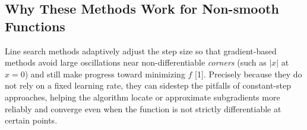\documentclass{article}
\begin{document}
\subsection{Why These Methods Work for Non-smooth Functions}
Line search methods adaptively adjust the step size so that gradient-based
methods avoid large oscillations near non-differentiable \emph{corners} (such as
$|x|$ at $x=0$) and still make progress toward minimizing $f$ [1]. Precisely
because they do not rely on a fixed learning rate, they can sidestep the
pitfalls of constant-step approaches, helping the algorithm locate or
approximate subgradients more reliably and converge even when the function is
not strictly differentiable at certain points.
\end{document}
